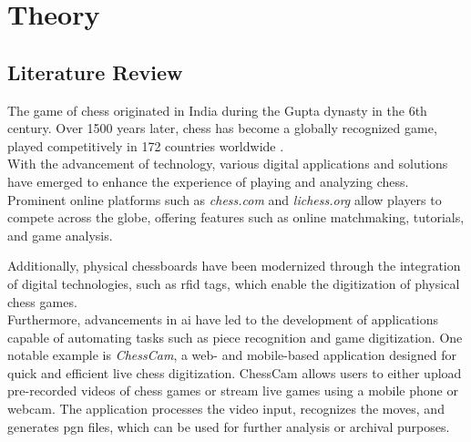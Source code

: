 \chapter{Theory}

\section{Literature Review}

The game of chess originated in India during the Gupta dynasty in the 6th century. Over 1500 years later, chess has become a globally recognized game, played competitively in 172 countries worldwide \cite{artsnculture}. \\

With the advancement of technology, various digital applications and solutions have emerged to enhance the experience of playing and analyzing chess. Prominent online platforms such as \textit{chess.com} and \textit{lichess.org} allow players to compete across the globe, offering features such as online matchmaking, tutorials, and game analysis. 

Additionally, physical chessboards have been modernized through the integration of digital technologies, such as \gls{rfid} tags, which enable the digitization of physical chess games. \cite{quora:shah} \\

Furthermore, advancements in \gls{ai} have led to the development of applications capable of automating tasks such as piece recognition and game digitization. One notable example is \textit{ChessCam}, a web- and mobile-based application designed for quick and efficient live chess digitization. ChessCam allows users to either upload pre-recorded videos of chess games or stream live games using a mobile phone or webcam. The application processes the video input, recognizes the moves, and generates \gls{pgn} files, which can be used for further analysis or archival purposes.


